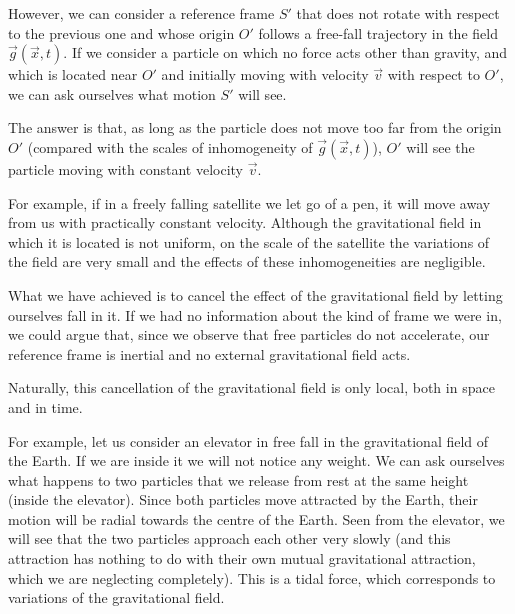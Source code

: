 \begin{points}
\item However, we can consider a reference frame $S'$ that does not rotate with respect to the previous one and whose origin $O'$ follows a free-fall trajectory in the field $\vec g(\vec x,t)$. If we consider a particle on which no force acts other than gravity, and which is located near $O'$ and initially moving with velocity $\vec v$ with respect to $O'$, we can ask ourselves what motion $S'$ will see.

\item The answer is that, as long as the particle does not move too far from the origin $O'$ (compared with the scales of inhomogeneity of $\vec g(\vec x,t)$), $O'$ will see the particle moving with constant velocity $\vec v$.

\item For example, if in a freely falling satellite we let go of a pen, it will move away from us with practically constant velocity. Although the gravitational field in which it is located is not uniform, on the scale of the satellite the variations of the field are very small and the effects of these inhomogeneities are negligible.

\item What we have achieved is to cancel the effect of the gravitational field by letting ourselves fall in it. If we had no information about the kind of frame we were in, we could argue that, since we observe that free particles do not accelerate, our reference frame is inertial and no external gravitational field acts.

\item Naturally, this cancellation of the gravitational field is only local, both in space and in time.

\item For example, let us consider an elevator in free fall in the gravitational field of the Earth. If we are inside it we will not notice any weight. We can ask ourselves what happens to two particles that we release from rest at the same height (inside the elevator). Since both particles move attracted by the Earth, their motion will be radial towards the centre of the Earth. Seen from the elevator, we will see that the two particles approach each other very slowly (and this attraction has nothing to do with their own mutual gravitational attraction, which we are neglecting completely). This is a tidal force, which corresponds to variations of the gravitational field.


\end{points}
